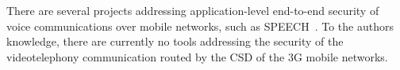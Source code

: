 \documentclass[10pt, conference, compsocconf]{IEEEtran}
\begin{document}


There are several projects addressing application-level end-to-end security of voice communications over mobile networks, such as SPEECH~\cite{speech}. To the authors knowledge, there are currently no tools addressing the security of the videotelephony communication routed by the CSD of the 3G mobile networks.




\end{document}
